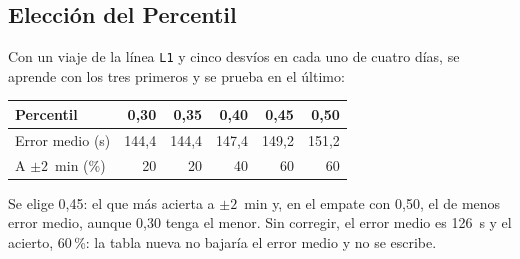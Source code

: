 \subsection{Elección del Percentil} Con un viaje de la línea \texttt{L1} y cinco desvíos en cada uno de cuatro días,
se aprende con los tres primeros y se prueba en el último:

\begin{center}
\small
\begin{tabular}{@{}lrrrrr@{}}
\toprule
Percentil & 0,30 & 0,35 & 0,40 & 0,45 & 0,50\\
\midrule
Error medio (s) & 144,4 & 144,4 & 147,4 & 149,2 & 151,2\\
A $\pm2$~min (\%) & 20 & 20 & 40 & 60 & 60\\
\bottomrule
\end{tabular}
\end{center}

\noindent Se elige 0,45: el que más acierta a $\pm2$~min y, en el empate con 0,50, el de menos error medio, aunque 0,30
tenga el menor. Sin corregir, el error medio es 126~s y el acierto, 60\,\%: la tabla nueva no bajaría el error medio y
no se escribe.
